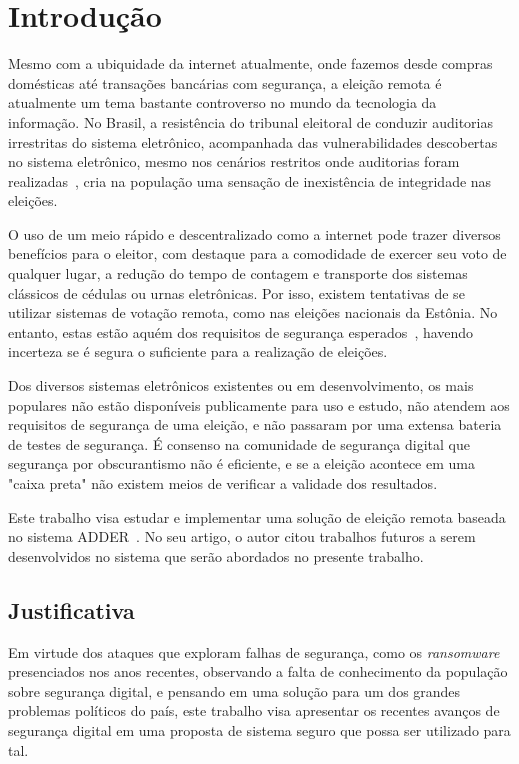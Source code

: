 

\chapter{Introdução}

Mesmo com a ubiquidade da internet atualmente, onde fazemos desde compras
domésticas até transações bancárias com segurança, a eleição remota é
atualmente um tema bastante controverso no mundo da tecnologia da informação.
No Brasil, a resistência do tribunal eleitoral de conduzir auditorias
irrestritas do sistema eletrônico, acompanhada das vulnerabilidades descobertas
no sistema eletrônico, mesmo nos cenários restritos onde auditorias foram
realizadas~\cite{aranhavulnerabilidades}, cria na população uma sensação de
inexistência de integridade nas eleições.

O uso de um meio rápido e descentralizado como a internet pode trazer diversos
benefícios para o eleitor, com destaque para a comodidade de exercer seu voto
de qualquer lugar, a redução do tempo de contagem e transporte dos sistemas
clássicos de cédulas ou urnas eletrônicas. Por isso, existem tentativas de se
utilizar sistemas de votação remota, como nas eleições nacionais da Estônia. No
entanto, estas estão aquém dos requisitos de segurança
esperados~\cite{Springall:2014:SAE:2660267.2660315}, havendo incerteza se é
segura o suficiente para a realização de eleições.

Dos diversos sistemas eletrônicos existentes ou em desenvolvimento, os mais
populares não estão disponíveis publicamente para uso e estudo, não atendem aos
requisitos de segurança de uma eleição, e não passaram por uma extensa bateria
de testes de segurança. É consenso na comunidade de segurança digital que
segurança por obscurantismo não é eficiente, e se a eleição acontece em uma
"caixa preta" não existem meios de verificar a validade dos resultados.

Este trabalho visa estudar e implementar uma solução de eleição remota baseada
no sistema ADDER~\cite{kiayias2006internet}. No seu artigo, o autor citou
trabalhos futuros a serem desenvolvidos no sistema que serão abordados no
presente trabalho.

\section{Justificativa}

Em virtude dos ataques que exploram falhas de segurança, como os
\textit{ransomware} presenciados nos anos recentes, observando a falta de
conhecimento da população sobre segurança digital, e pensando em uma solução
para um dos grandes problemas políticos do país, este trabalho visa apresentar
os recentes avanços de segurança digital em uma proposta de sistema seguro que
possa ser utilizado para tal.

